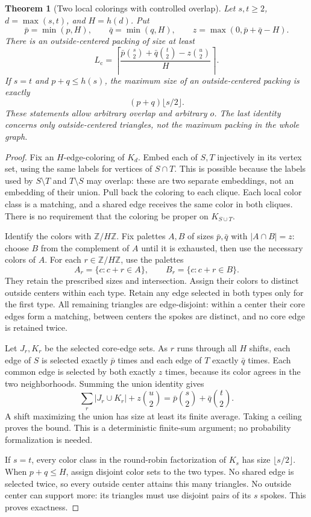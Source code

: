 \documentclass[11pt]{article}
\newtheorem{theorem}{Theorem}
\begin{document}
\begin{theorem}[Two local colorings with controlled overlap]\label{thm:coupled}
Let $s,t\geq2$, $d=\max(s,t)$, and $H=h(d)$. Put
\[
 \bar p=\min(p,H),\qquad \bar q=\min(q,H),\qquad
 z=\max(0,\bar p+\bar q-H).
\]
There is an outside-centered packing of size at least
\[
 \boxed{L_{\mathrm c}=\left\lceil
 \frac{\bar p\binom s2+\bar q\binom t2-z\binom u2}{H}
 \right\rceil.}
\]
If $s=t$ and $p+q\leq h(s)$, the maximum size of an outside-centered
packing is exactly
\[
 \boxed{(p+q)\lfloor s/2\rfloor.}
\]
These statements allow arbitrary overlap and arbitrary $o$.
The last identity concerns only outside-centered triangles, not the
maximum packing in the whole graph.
\end{theorem}
\begin{proof}
Fix an $H$-edge-coloring of $K_d$. Embed each of $S,T$ injectively in its
vertex set, using the same labels for vertices of $S\cap T$. This is
possible because the labels used by $S\setminus T$ and $T\setminus S$
may overlap: these are two separate embeddings, not an embedding of their
union. Pull back the coloring to each clique. Each local color class is
a matching, and a shared edge receives the same color in both cliques.
There is no requirement that the coloring be proper on $K_{S\cup T}$.

Identify the colors with $\mathbb Z/H\mathbb Z$. Fix palettes $A,B$
of sizes $\bar p,\bar q$ with $|A\cap B|=z$: choose $B$ from the
complement of $A$ until it is exhausted, then use the necessary colors
of $A$. For each $r\in\mathbb Z/H\mathbb Z$, use the palettes
\[
 A_r=\{c:c+r\in A\},\qquad B_r=\{c:c+r\in B\}.
\]
They retain the prescribed sizes and intersection. Assign their colors
to distinct outside centers within each type. Retain any edge selected
in both types only for the first type. All remaining triangles are
edge-disjoint: within a center their core edges form a matching,
between centers the spokes are distinct, and no core edge is retained
twice.

Let $J_r,K_r$ be the selected core-edge sets. As $r$ runs through all
$H$ shifts, each edge of $S$ is selected exactly $\bar p$ times and
each edge of $T$ exactly $\bar q$ times. Each common edge is selected
by both exactly $z$ times, because its color agrees in the two
neighborhoods. Summing the union identity gives
\[
 \sum_r |J_r\cup K_r|+z\binom u2
   =\bar p\binom s2+\bar q\binom t2.
\]
A shift maximizing the union has size at least its finite average.
Taking a ceiling proves the bound. This is a deterministic finite-sum
argument; no probability formalization is needed.

If $s=t$, every color class in the round-robin factorization of $K_s$ has
size $\lfloor s/2\rfloor$. When $p+q\leq H$, assign disjoint color sets to
the two types. No shared edge is selected twice, so every outside center
attains this many triangles. No outside center can support more: its
triangles must use disjoint pairs of its $s$ spokes. This proves exactness.
\end{proof}
\end{document}

